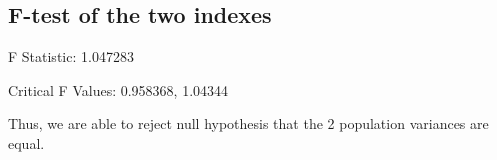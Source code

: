 \documentclass[a4paper]{article}
\begin{document}
	\subsection{F-test of the two indexes}
	\begin{flushleft}
		F Statistic: 1.047283
		
		Critical F Values: 0.958368, 1.04344
		
		Thus, we are able to reject null hypothesis that the 2 population variances are equal.
	\end{flushleft}
	
	
\end{document}
